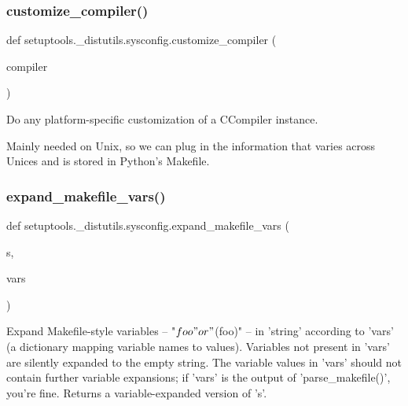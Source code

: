 \subsubsection{\texorpdfstring{customize\+\_\+compiler()}{customize\_compiler()}}
{\footnotesize\ttfamily def setuptools.\+\_\+distutils.\+sysconfig.\+customize\+\_\+compiler (\begin{DoxyParamCaption}\item[{}]{compiler }\end{DoxyParamCaption})}

\begin{DoxyVerb}Do any platform-specific customization of a CCompiler instance.

Mainly needed on Unix, so we can plug in the information that
varies across Unices and is stored in Python's Makefile.
\end{DoxyVerb}
 \mbox{\label{namespacesetuptools_1_1__distutils_1_1sysconfig_a90d216e1605d30720ae20edec827b572}} 
\subsubsection{\texorpdfstring{expand\+\_\+makefile\+\_\+vars()}{expand\_makefile\_vars()}}
{\footnotesize\ttfamily def setuptools.\+\_\+distutils.\+sysconfig.\+expand\+\_\+makefile\+\_\+vars (\begin{DoxyParamCaption}\item[{}]{s,  }\item[{}]{vars }\end{DoxyParamCaption})}

\begin{DoxyVerb}Expand Makefile-style variables -- "${foo}" or "$(foo)" -- in
'string' according to 'vars' (a dictionary mapping variable names to
values).  Variables not present in 'vars' are silently expanded to the
empty string.  The variable values in 'vars' should not contain further
variable expansions; if 'vars' is the output of 'parse_makefile()',
you're fine.  Returns a variable-expanded version of 's'.
\end{DoxyVerb}
 \mbox{\label{namespacesetuptools_1_1__distutils_1_1sysconfig_ae6fb6b585fe013858034390dbca0fb37}} 
